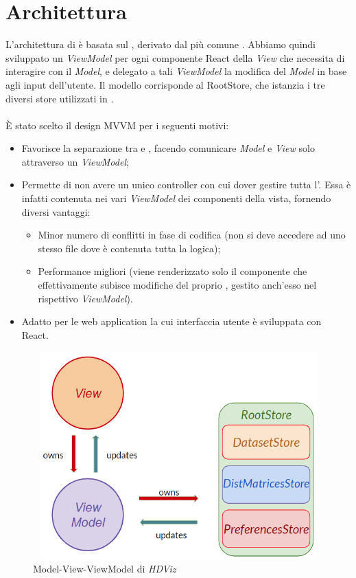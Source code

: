 \section{Architettura}
L'architettura di \NomeProgetto{} è basata sul  , derivato dal più comune . 
Abbiamo quindi sviluppato un \textit{ViewModel} per ogni componente React della \textit{View} che necessita di interagire con il \textit{Model}, e delegato a tali \textit{ViewModel} la modifica del \textit{Model} in base agli input dell'utente. 
Il modello corrisponde al RootStore, che istanzia i tre diversi store utilizzati in \NomeProgetto{}. \\ \mbox{}\\
È stato scelto il design MVVM per i seguenti motivi: 
\begin{itemize}
	\item Favorisce la separazione tra  e , facendo comunicare \textit{Model} e \textit{View} solo attraverso un \textit{ViewModel};  
	\item Permette di non avere un unico controller con cui dover gestire tutta l'. Essa è infatti contenuta nei vari \textit{ViewModel} dei componenti della vista, fornendo diversi vantaggi: 
	\begin{itemize}
		\item Minor numero di conflitti in fase di codifica (non si deve accedere ad uno stesso file dove è contenuta tutta la logica);
		\item Performance migliori (viene renderizzato solo il componente che effettivamente subisce modifiche del proprio , gestito anch'esso nel rispettivo \textit{ViewModel}).
	\end{itemize}
	\item Adatto per le web application la cui interfaccia utente è sviluppata con React.
\end{itemize}

\begin{figure}[hb]
\includegraphics[width=11.8cm,height=8cm]{Extra/MVVMPattern}
\centering
\caption{Model-View-ViewModel di \textit{HDViz}}
\end{figure}

\newpage

\newpage

\newpage

\newpage

